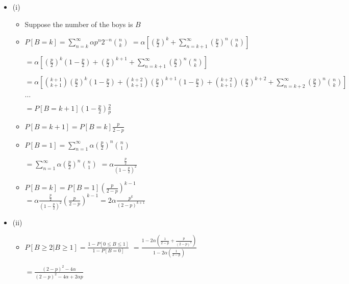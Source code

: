 \documentclass[a4paper]{article}
\begin{document}
\section{}
\begin{itemize}
\begin{figure} [H]
    \texttt{[image: question/3.png]}
\end{figure}
    \item (i)
        \begin{itemize}
            \item Suppose the number of the boys is $B$
            \item $P[B = k] = \sum_{n=k}^\infty \alpha p^n 2^{-n} \binom{n}{k}$
                $= \alpha[ (\frac{p}{2})^k + \sum_{n=k + 1}^\infty (\frac{p}{2})^n \binom{n}{k}]$

                $= \alpha[ (\frac{p}{2})^k(1-\frac{p}{2}) + (\frac{p}{2})^{k+1} + \sum_{n=k + 1}^\infty (\frac{p}{2})^n \binom{n}{k}]$

                $= \alpha[ \binom{k+1}{k+1}(\frac{p}{2})^k(1-\frac{p}{2}) + \binom{k+2}{k+1}(\frac{p}{2})^{k+1}(1 - \frac{p}{2}) + \binom{k+2}{k+1}(\frac{p}{2})^{k+2} + \sum_{n=k + 2}^\infty (\frac{p}{2})^n \binom{n}{k}]$

                $\dots$

                $= P[B=k+1] (1-\frac{p}{2}) \frac{2}{p}$
            \item $P[B=k+1] = P[B=k] \frac{p}{2-p}$
            \item $P[B=1] = \sum_{n=1}^\infty \alpha (\frac{p}{2})^n \binom{n}{1}$

                $= \sum_{n=1}^\infty \alpha (\frac{p}{2})^n \binom{n}{1}$
                $= \alpha \frac{\frac{p}{2}}{(1-\frac{p}{2})^2}$
            \item $P[B=k] = P[B=1] (\frac{p}{2-p})^{k-1}$
                $= \alpha \frac{\frac{p}{2}}{(1-\frac{p}{2})^2} (\frac{p}{2-p})^{k-1} = 2\alpha \frac{p^k}{(2-p)^{k+1}}$
        \end{itemize}
    \item (ii)
        \begin{itemize}
            \item $P[B \geq 2|B\geq 1] = \frac{1 - P[0 \leq B \leq 1]}{1 - P[B = 0]}$
                $= \frac{1 - 2\alpha(\frac{1}{2-p} + \frac{p}{(2-p)^2})}{1 - 2\alpha(\frac{1}{2-p})}$

                $= \frac{(2-p)^2 - 4\alpha}{(2-p)^2 - 4\alpha + 2\alpha p}$
        \end{itemize}
\end{itemize}
\end{document}
